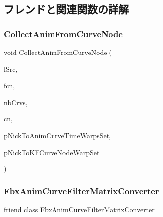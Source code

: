 \subsection{フレンドと関連関数の詳解}
\mbox{\label{class_fbx_anim_curve_node_a54d20e7508453ca014d08b85da892621}} 
\subsubsection{\texorpdfstring{Collect\+Anim\+From\+Curve\+Node}{CollectAnimFromCurveNode}}
{\footnotesize\ttfamily void Collect\+Anim\+From\+Curve\+Node (\begin{DoxyParamCaption}\item[{void $\ast$$\ast$}]{l\+Src,  }\item[{void $\ast$}]{fcn,  }\item[{unsigned int}]{nb\+Crvs,  }\item[{\hyperlink{class_fbx_anim_curve_node}{Fbx\+Anim\+Curve\+Node} $\ast$}]{cn,  }\item[{\hyperlink{class_fbx_multi_map}{Fbx\+Multi\+Map} $\ast$}]{p\+Nick\+To\+Anim\+Curve\+Time\+Warps\+Set,  }\item[{\hyperlink{class_fbx_multi_map}{Fbx\+Multi\+Map} \&}]{p\+Nick\+To\+K\+F\+Curve\+Node\+Warp\+Set }\end{DoxyParamCaption})\hspace{0.3cm}{\ttfamily [friend]}}

\mbox{\label{class_fbx_anim_curve_node_a0e66be27522fe93db7ee48dbdb4420bb}} 
\subsubsection{\texorpdfstring{Fbx\+Anim\+Curve\+Filter\+Matrix\+Converter}{FbxAnimCurveFilterMatrixConverter}}
{\footnotesize\ttfamily friend class \hyperlink{class_fbx_anim_curve_filter_matrix_converter}{Fbx\+Anim\+Curve\+Filter\+Matrix\+Converter}\hspace{0.3cm}{\ttfamily [friend]}}



